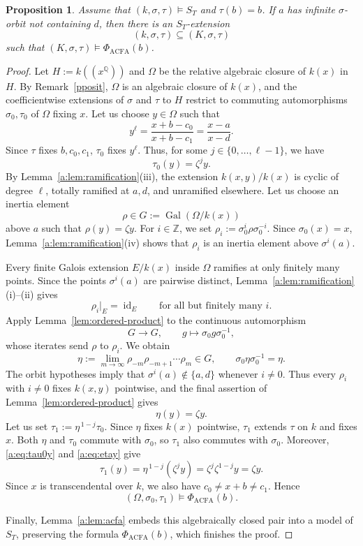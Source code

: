 \documentclass[11pt,a4paper]{amsart}
\newtheorem{proposition}[theorem]{Proposition}
\theoremstyle{definition}
\newcommand{\Q}{\mathbb Q}
\newcommand{\Z}{\mathbb Z}
\DeclareMathOperator{\Gal}{Gal}
\DeclareMathOperator{\id}{id}
\begin{document}
\begin{proposition}\label{a:prop:realization}
Assume that $(k,\sigma,\tau)\models S_T$ and $\tau(b)=b$.
If $a$ has infinite $\sigma$-orbit not containing $d$, then there is an $S_T$-extension
\[
(k,\sigma,\tau)\subseteq(K,\sigma,\tau)
\]
such that $(K,\sigma,\tau)\models\Phi_{\mathrm{ACFA}}(b)$.
\end{proposition}
\begin{proof}
Let $H:=k((x^{\Q}))$ and $\Omega$ be the relative algebraic closure of $k(x)$
in $H$. By Remark~\ref{pposit}, $\Omega$ is an algebraic closure
of $k(x)$, and the coefficientwise extensions of $\sigma$ and
$\tau$ to $H$ restrict to commuting automorphisms $\sigma_0,\tau_0$
of $\Omega$ fixing $x$. Let us choose $y\in\Omega$ such that
\[
y^\ell=\frac{x+b-c_0}{x+b-c_1}
      =\frac{x-a}{x-d}.
\]
Since $\tau$ fixes $b,c_0,c_1$, $\tau_0$
fixes $y^\ell$. Thus, for some
$j\in\{0,\ldots,\ell-1\}$, we have
\begin{equation}\label{a:eq:tau0y}
\tau_0(y)=\zeta^j y.
\end{equation}
By Lemma~\ref{a:lem:ramification}(iii), the extension
$k(x,y)/k(x)$ is cyclic of degree $\ell$, totally ramified
at $a,d$, and unramified elsewhere. Let us choose an inertia element
\[
\rho\in G:=\Gal(\Omega/k(x))
\]
above $a$ such that $\rho(y)=\zeta y$.
For $i\in\Z$, we set $\rho_i:=\sigma_0^i\rho\sigma_0^{-i}$. 
Since $\sigma_0(x)=x$, Lemma~\ref{a:lem:ramification}(iv)
shows that $\rho_i$ is an inertia element above $\sigma^i(a)$.

Every finite Galois extension $E/k(x)$ inside $\Omega$
ramifies at only finitely many points. Since the points
$\sigma^i(a)$ are pairwise distinct,
Lemma~\ref{a:lem:ramification}(i)--(ii) gives
\[
\rho_i|_E=\id_E
\qquad\text{for all but finitely many }i.
\]
Apply Lemma~\ref{lem:ordered-product} to the continuous
automorphism
\[
G\longrightarrow G,\qquad
g\longmapsto\sigma_0g\sigma_0^{-1},
\]
whose iterates send $\rho$ to $\rho_i$.
We obtain
\[
\eta:=\lim_{m\to\infty}\rho_{-m}\rho_{-m+1}\cdots\rho_m\in G,
\qquad
\sigma_0\eta\sigma_0^{-1}=\eta.
\]
The orbit hypotheses imply that
$\sigma^i(a)\notin\{a,d\}$ whenever $i\ne0$.
Thus every $\rho_i$ with $i\ne0$ fixes $k(x,y)$ pointwise,
and the final assertion of Lemma~\ref{lem:ordered-product}
gives
\begin{equation}\label{a:eq:etay}
\eta(y)=\zeta y.
\end{equation}
Let us set $\tau_1:=\eta^{\,1-j}\tau_0$. 
Since $\eta$ fixes $k(x)$ pointwise, $\tau_1$ extends $\tau$
on $k$ and fixes $x$. Both $\eta$ and $\tau_0$ commute with
$\sigma_0$, so $\tau_1$ also commutes with $\sigma_0$.
Moreover, \eqref{a:eq:tau0y} and \eqref{a:eq:etay} give
\[
\tau_1(y)
=\eta^{\,1-j}(\zeta^j y)
=\zeta^j\zeta^{1-j}y
=\zeta y.
\]
Since $x$ is transcendental over $k$, we also have
$c_0\ne x+b\ne c_1$. Hence
\[
(\Omega,\sigma_0,\tau_1)\models\Phi_{\mathrm{ACFA}}(b).
\]

Finally, Lemma~\ref{a:lem:acfa} embeds this algebraically
closed pair into a model of $S_T$, preserving the formula
$\Phi_{\mathrm{ACFA}}(b)$, which finishes the proof.
\end{proof}
\end{document}
